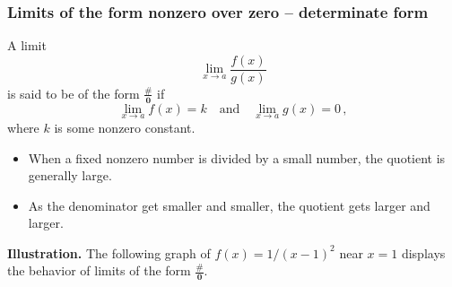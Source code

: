 \documentclass[10pt,t,presentation,ignorenonframetext,aspectratio=169]{beamer}
\begin{document}
\begin{frame}
  \frametitle{Limits of the form nonzero over zero -- determinate form}
  \begin{defn}
    A limit
    \[
      \lim_{x \to a} \frac{f(x)}{g(x)}
    \]
    is said to be of the form $\mathbf{ \frac{\#}{0} }$ if
    \[
      \lim_{x \to a} f(x) = k
      \quad \text{and} \quad
      \lim_{x \to a} g(x) = 0 \,,
    \]
    where $k$ is some nonzero constant.
  \end{defn}
  \begin{itemize}
  \item When a fixed nonzero number is divided by a small number, the
    quotient is generally large.
  \item As the denominator get smaller and smaller, the quotient gets
    larger and larger.
  \end{itemize}
\end{frame}

\begin{frame}
  \vs
  \textbf{Illustration.} The following graph of
  $f(x) = 1/(x-1)^2$ near $x = 1$ displays the behavior of limits of
  the form $\mathbf{ \frac{\#}{0} }$.

  \begin{image}[2.3in]
  \end{image}
\end{frame}
\end{document}
